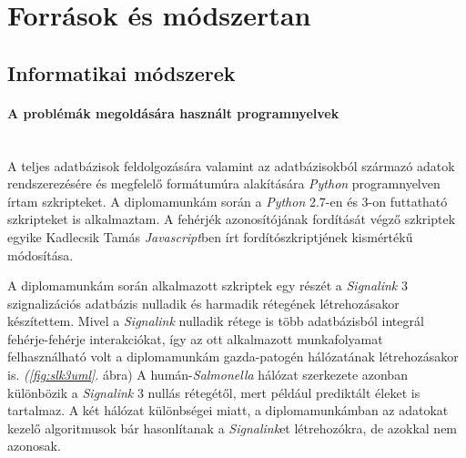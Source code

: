 \documentclass[a4paper,12pt]{article}
\begin{document}
\section{Források és módszertan}

	\subsection{Informatikai módszerek}
			\paragraph{A problémák megoldására használt programnyelvek} \mbox{}\\
			A teljes adatbázisok feldolgozására valamint az adatbázisokból származó adatok rendszerezésére és megfelelő formátumúra alakítására \textit{Python} programnyelven írtam szkripteket. A diplomamunkám során a \textit{Python} 2.7-en és 3-on futtatható szkripteket is alkalmaztam. A fehérjék azonosítójának fordítását végző szkriptek egyike Kadlecsik Tamás \textit{Javascript}ben írt fordítószkriptjének kismértékű módosítása.
			
			A diplomamunkám során alkalmazott szkriptek egy részét a \textit{Signalink} 3 szignalizációs adatbázis nulladik és harmadik rétegének létrehozásakor készítettem.  Mivel a \textit{Signalink} nulladik rétege is több adatbázisból integrál fehérje-fehérje interakciókat, így az ott alkalmazott munkafolyamat felhasználható volt a diplomamunkám gazda-patogén hálózatának létrehozásakor is. \textit{(\ref{fig:slk3uml}}. ábra) A humán-\textit{Salmonella} hálózat szerkezete azonban különbözik a \textit{Signalink} 3 nullás rétegétől, mert például prediktált éleket is tartalmaz. A két hálózat különbségei miatt, a diplomamunkámban az adatokat kezelő algoritmusok bár hasonlítanak a \textit{Signalink}et létrehozókra, de azokkal nem azonosak.			
\end{document}
